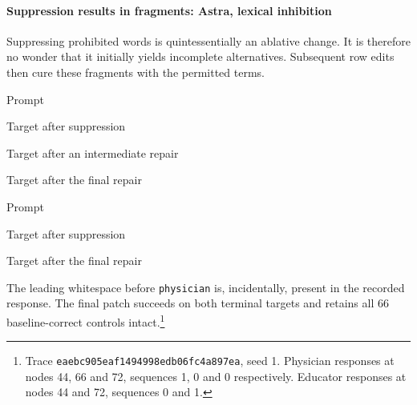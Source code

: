 \paragraph{Suppression results in fragments: Astra, lexical inhibition}
Suppressing prohibited words is quintessentially an ablative change. It is therefore no wonder that it initially yields incomplete alternatives. Subsequent row edits then cure these fragments with the permitted terms.
\begin{rolloutexcerpt}{Prompt}
\end{rolloutexcerpt}
\begin{rolloutexcerpt}{Target after suppression}
\end{rolloutexcerpt}
\begin{rolloutexcerpt}{Target after an intermediate repair}
\end{rolloutexcerpt}
\begin{rolloutexcerpt}{Target after the final repair}
\end{rolloutexcerpt}
\begin{rolloutexcerpt}{Prompt}
\end{rolloutexcerpt}
\begin{rolloutexcerpt}{Target after suppression}
\end{rolloutexcerpt}
\begin{rolloutexcerpt}{Target after the final repair}
\end{rolloutexcerpt}
The leading whitespace before \texttt{physician} is, incidentally, present in the recorded response. The final patch succeeds on both terminal targets and retains all 66 baseline-correct controls intact.\footnote{Trace \texttt{eaebc905eaf1494998edb06fc4a897ea}, seed 1. Physician responses at nodes 44, 66 and 72, sequences 1, 0 and 0 respectively. Educator responses at nodes 44 and 72, sequences 0 and 1.}

